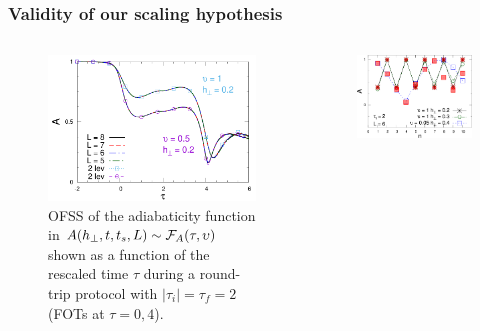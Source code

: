 \begin{frame}
    \frametitle{Validity of our scaling hypothesis}




	\begin{columns}
        \begin{column}{0.52\textwidth}
            \begin{figure}[t]
                \includegraphics[width=1.\columnwidth]{paper/tripAt2u05g02-new.pdf}
                \caption{OFSS  of the adiabaticity function in $A(h_\perp,t,t_s,L)\sim {\cal F}_A(\tau,\upsilon)$ shown as a function of the rescaled time $\tau$ during a round-trip protocol with $|\tau_i|=\tau_f =2$ (FOTs at $\tau=0,4$).}
                \label{AtripAt2u05g02}
            \end{figure}
        \end{column}
        \begin{column}{0.5\textwidth}
            \begin{figure}[t]
                \centering
                \includegraphics[width=1.\columnwidth]{paper/strobA.pdf}

\end{figure}
\end{column}
\end{columns}
\end{frame}
